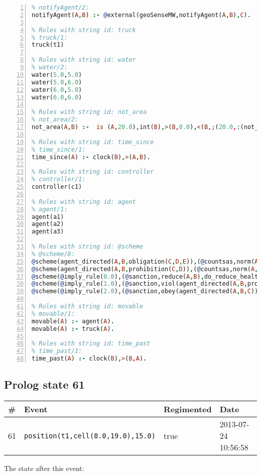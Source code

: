 \documentclass[11pt]{article}\usepackage[utf8]{inputenc}\usepackage{geometry}
\begin{document}
\begin{lstlisting}[language=Prolog, numbers=left]
% Rules with string id: notifyAgent
% notifyAgent/2:
notifyAgent(A,B) :- @external(geoSenseMW,notifyAgent(A,B),C).

% Rules with string id: truck
% truck/1:
truck(t1)

% Rules with string id: water
% water/2:
water(5.0,5.0)
water(5.0,6.0)
water(6.0,5.0)
water(6.0,6.0)

% Rules with string id: not_area
% not_area/2:
not_area(A,B) :-  is (A,20.0),int(B),>(B,0.0),<(B,;(20.0,:(not_area(A,B), is (-(B),20.0)))),int(A),>(A,0.0),<(A,;(20.0,:(area(A,B),-(int(A))))),int(B),>(A,0.0),>(B,0.0),<(A,21.0),<(B,21.0).

% Rules with string id: time_since
% time_since/1:
time_since(A) :- clock(B),>(A,B).

% Rules with string id: controller
% controller/1:
controller(c1)

% Rules with string id: agent
% agent/1:
agent(a1)
agent(a2)
agent(a3)

% Rules with string id: @scheme
% @scheme/8:
@scheme(agent_directed(A,B,obligation(C,D,E)),(@countsas,norm(A,B,F,obligation(C,D,E)),F),false,(listTrue(C)),(time_past(D)),false,[plus(viol(agent_directed(A,B,obligation(C,D,E))))|[]],[plus(obey(agent_directed(A,B,obligation(C,D,E))))|[]])
@scheme(agent_directed(A,B,prohibition(C,D)),(@countsas,norm(A,B,E,prohibition(C,D)),E),(listTrue(C)),false,(false),false,[plus(viol(agent_directed(A,B,prohibition(C,D))))|[]],[plus(obey(agent_directed(A,B,prohibition(C,D))))|[]])
@scheme(@imply_rule(0.0),(@sanction,reduce(A,B),do_reduce_health(A,B),notifyAgent(A,changed(status))),true,false,false,false,[min(reduce(A,B))|[]],[])
@scheme(@imply_rule(1.0),(@sanction,viol(agent_directed(A,B,prohibition(C,D))),do_sanction(D)),true,false,false,false,[min(viol(agent_directed(A,B,prohibition(C,D))))|[]],[])
@scheme(@imply_rule(2.0),(@sanction,obey(agent_directed(A,B,C))),true,false,false,false,[min(obey(agent_directed(A,B,C)))|[]],[])

% Rules with string id: movable
% movable/1:
movable(A) :- agent(A).
movable(A) :- truck(A).

% Rules with string id: time_past
% time_past/1:
time_past(A) :- clock(B),>(B,A).

\end{lstlisting}
\clearpage 
\subsection{Prolog state 61}
\begin{table}[ht]
\centering 
\begin{tabular}{l l l l} 
\textbf{\#} & \textbf{Event} & \textbf{Regimented} & \textbf{Date} \\ [0.5ex] 
\hline
61&\texttt{position(t1,cell(8.0,19.0),15.0)}&true&2013-07-24 10:56:58\\ [1ex] \hline\end{tabular}
\end{table}
The state after this event:
\end{document}
